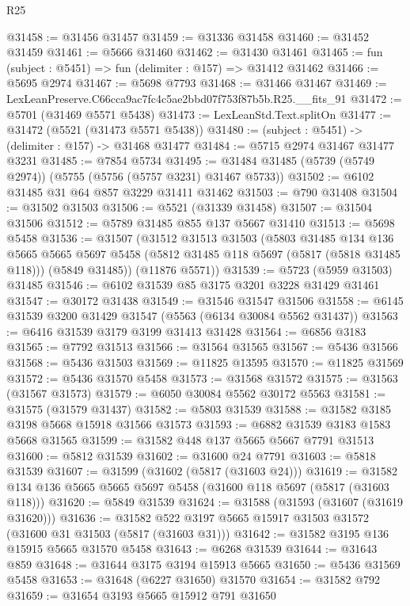 \begin{lexlean}{R25}
\begin{coremodule}
@31458 := @31456 @31457
@31459 := @31336 @31458
@31460 := @31452 @31459
@31461 := @5666 @31460
@31462 := @31430 @31461
@31465 := fun (subject : @5451) => fun (delimiter : @157) => @31412 @31462
@31466 := @5695 @2974
@31467 := @5698 @7793
@31468 := @31466 @31467
@31469 := LexLeanPreserve.C66cca9ac7fc4c5ae2bbd07f753f87b5b.R25.__fits_91
@31472 := @5701 (@31469 @5571 @5438)
@31473 := LexLeanStd.Text.splitOn
@31477 := @31472 (@5521 (@31473 @5571 @5438))
@31480 := (subject : @5451) -> (delimiter : @157) -> @31468 @31477
@31484 := @5715 @2974 @31467 @31477 @3231
@31485 := @7854 @5734
@31495 := @31484 @31485 (@5739 (@5749 @2974)) (@5755 (@5756 (@5757 @3231) @31467 @5733))
@31502 := @6102 @31485 @31 @64 @857 @3229 @31411 @31462
@31503 := @790 @31408
@31504 := @31502 @31503
@31506 := @5521 (@31339 @31458)
@31507 := @31504 @31506
@31512 := @5789 @31485 @855 @137 @5667 @31410
@31513 := @5698 @5458
@31536 := @31507
    (@31512
      @31513
      @31503
      (@5803
        @31485
        @134
        @136
        @5665
        @5665
        @5697
        @5458
        (@5812 @31485 @118 @5697 (@5817 (@5818 @31485 @118)))
        (@5849 @31485))
      (@11876 @5571))
@31539 := @5723 (@5959 @31503) @31485
@31546 := @6102 @31539 @85 @3175 @3201 @3228 @31429 @31461
@31547 := @30172 @31438
@31549 := @31546 @31547 @31506
@31558 := @6145 @31539 @3200 @31429 @31547 (@5563 (@6134 @30084 @5562 @31437))
@31563 := @6416 @31539 @3179 @3199 @31413 @31428
@31564 := @6856 @3183
@31565 := @7792 @31513
@31566 := @31564 @31565
@31567 := @5436 @31566
@31568 := @5436 @31503
@31569 := @11825 @13595
@31570 := @11825 @31569
@31572 := @5436 @31570 @5458
@31573 := @31568 @31572
@31575 := @31563 (@31567 @31573)
@31579 := @6050 @30084 @5562 @30172 @5563
@31581 := @31575 (@31579 @31437)
@31582 := @5803 @31539
@31588 := @31582 @3185 @3198 @5668 @15918 @31566 @31573
@31593 := @6882 @31539 @3183 @1583 @5668 @31565
@31599 := @31582 @448 @137 @5665 @5667 @7791 @31513
@31600 := @5812 @31539
@31602 := @31600 @24 @7791
@31603 := @5818 @31539
@31607 := @31599 (@31602 (@5817 (@31603 @24)))
@31619 := @31582 @134 @136 @5665 @5665 @5697 @5458 (@31600 @118 @5697 (@5817 (@31603 @118)))
@31620 := @5849 @31539
@31624 := @31588 (@31593 (@31607 (@31619 @31620)))
@31636 := @31582 @522 @3197 @5665 @15917 @31503 @31572 (@31600 @31 @31503 (@5817 (@31603 @31)))
@31642 := @31582 @3195 @136 @15915 @5665 @31570 @5458
@31643 := @6268 @31539
@31644 := @31643 @859
@31648 := @31644 @3175 @3194 @15913 @5665
@31650 := @5436 @31569 @5458
@31653 := @31648 (@6227 @31650) @31570
@31654 := @31582 @792
@31659 := @31654 @3193 @5665 @15912 @791 @31650

\end{coremodule}
\end{lexlean}
